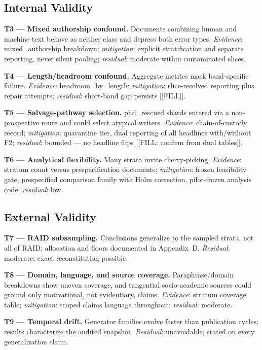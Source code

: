 \subsection{Internal Validity}
\textbf{T3 --- Mixed authorship confound.} Documents combining human and
machine text behave as neither class and depress both error types.
\emph{Evidence}: mixed\_authorship breakdown; \emph{mitigation}: explicit
stratification and separate reporting, never silent pooling;
\emph{residual}: moderate within contaminated slices.

\textbf{T4 --- Length/headroom confound.} Aggregate metrics mask
band-specific failure. \emph{Evidence}: headroom\_by\_length;
\emph{mitigation}: slice-resolved reporting plus repair attempts;
\emph{residual}: short-band gap persists [[FILL]].

\textbf{T5 --- Salvage-pathway selection.} phd\_rescued shards entered via
a non-prospective route and could select atypical writers. \emph{Evidence}:
chain-of-custody record; \emph{mitigation}: quarantine tier, dual
reporting of all headlines with/without F2; \emph{residual}: bounded ---
no headline flips [[FILL: confirm from dual tables]].

\textbf{T6 --- Analytical flexibility.} Many strata invite cherry-picking.
\emph{Evidence}: stratum count versus prespecification documents;
\emph{mitigation}: frozen feasibility gate, prespecified comparison family
with Holm correction, pilot-frozen analysis code; \emph{residual}: low.

\subsection{External Validity}
\textbf{T7 --- RAID subsampling.} Conclusions generalize to the sampled
strata, not all of RAID; allocation and floors documented in Appendix~D.
\emph{Residual}: moderate; exact reconstitution possible.

\textbf{T8 --- Domain, language, and source coverage.} Paraphrase/domain
breakdowns show uneven coverage, and tangential socio-academic sources
could ground only motivational, not evidentiary, claims. \emph{Evidence}:
stratum coverage table; \emph{mitigation}: scoped claims language
throughout; \emph{residual}: moderate.

\textbf{T9 --- Temporal drift.} Generator families evolve faster than
publication cycles; results characterize the audited snapshot.
\emph{Residual}: unavoidable; stated on every generalization claim.

